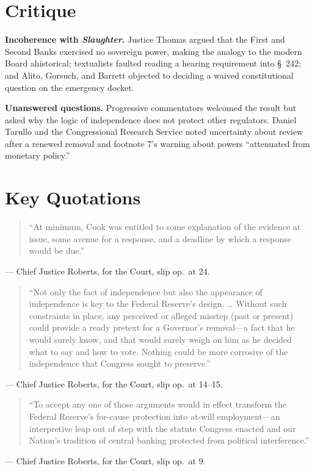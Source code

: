 \documentclass[12pt]{article}
\begin{document}
\section{Critique}

\textbf{Incoherence with \textit{Slaughter}.} Justice Thomas argued that the First and Second Banks exercised no sovereign power, making the analogy to the modern Board ahistorical; textualists faulted reading a hearing requirement into \S~242; and Alito, Gorsuch, and Barrett objected to deciding a waived constitutional question on the emergency docket.

\textbf{Unanswered questions.} Progressive commentators welcomed the result but asked why the logic of independence does not protect other regulators. Daniel Tarullo and the Congressional Research Service noted uncertainty about review after a renewed removal and footnote 7's warning about powers ``attenuated from monetary policy.''

\section{Key Quotations}

\begin{quote}
``At minimum, Cook was entitled to some explanation of the evidence at issue, some avenue for a response, and a deadline by which a response would be due.''
\end{quote}
\noindent --- Chief Justice Roberts, for the Court, slip op.\ at 24.

\begin{quote}
``Not only the fact of independence but also the appearance of independence is key to the Federal Reserve's design. \ldots{} Without such constraints in place, any perceived or alleged misstep (past or present) could provide a ready pretext for a Governor's removal---a fact that he would surely know, and that would surely weigh on him as he decided what to say and how to vote. Nothing could be more corrosive of the independence that Congress sought to preserve.''
\end{quote}
\noindent --- Chief Justice Roberts, for the Court, slip op.\ at 14--15.

\begin{quote}
``To accept any one of those arguments would in effect transform the Federal Reserve's for-cause protection into at-will employment---an interpretive leap out of step with the statute Congress enacted and our Nation's tradition of central banking protected from political interference.''
\end{quote}
\noindent --- Chief Justice Roberts, for the Court, slip op.\ at 9.
\end{document}
